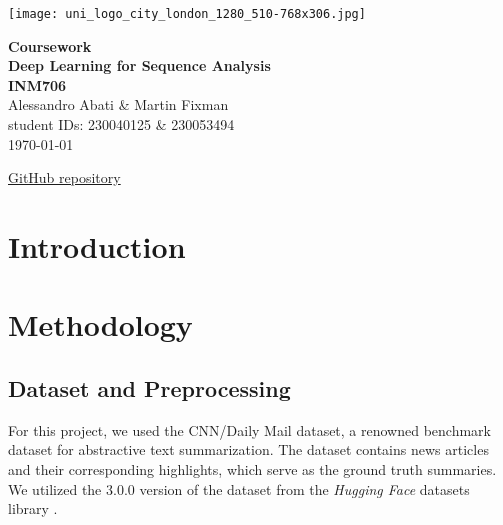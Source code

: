 \documentclass[a4papers, 11pt]{article}
\begin{document}
\begin{titlepage}
    \begin{minipage}{0.5\textwidth}
        \vspace{-2cm}
        \hspace{-1cm}
        \texttt{[image: uni\_logo\_city\_london\_1280\_510-768x306.jpg]}
    \end{minipage}
    \begin{center}
        \vspace{6cm}
        \begin{minipage}{0.7\textwidth}
        \centering
        {\huge\bfseries Coursework \vspace{10pt}\\ Deep Learning for Sequence Analysis  \vspace{10pt} \\ INM706}\\[2ex]
        \vspace{15pt}
        {\LARGE Alessandro Abati \& Martin Fixman}\\[1ex]
        {\large student IDs: 230040125 \& 230053494}\\[1ex]
        {\Large \today}
        \end{minipage}
    \end{center}
    \begin{center}
        {\Large \href{https://github.com/mfixman/ai-sequential}{GitHub repository}}
    \end{center}
\end{titlepage}

\newpage
\thispagestyle{empty}
\tableofcontents

\newpage
\thispagestyle{empty}
\section*{Introduction}

\newpage
\setcounter{page}{1}
\section{Methodology}

\subsection{Dataset and Preprocessing}

For this project, we used the CNN/Daily Mail dataset, a renowned benchmark dataset for abstractive text summarization. The dataset contains news articles and their corresponding highlights, which serve as the ground truth summaries. We utilized the 3.0.0 version of the dataset from the \textit{Hugging Face} datasets library \citep{huggingface_cnn_dailymail}. 
\end{document}
